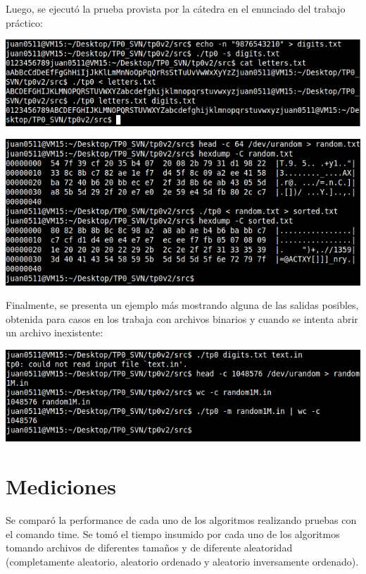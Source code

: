 \documentclass[a4paper,10pt]{article}
\begin{document}
Luego, se ejecut\'o la prueba provista por la c\'atedra en el enunciado del trabajo pr\'actico:
\begin{center}
\includegraphics[scale=0.60]{2.png}
\end{center}

\begin{center}
\includegraphics[scale=0.60]{3.png}
\end{center}
\pagebreak

Finalmente, se presenta un ejemplo m\'as mostrando alguna de las salidas posibles, obtenida para casos en los trabaja con archivos binarios y cuando se intenta abrir un archivo inexistente:\\
\begin{center}
\includegraphics[scale=0.60]{4.png}
\end{center}
\pagebreak

\section{Mediciones} 
Se compar\'o la performance de cada uno de los algoritmos realizando pruebas con el comando time. Se tom\'o el tiempo insumido por cada uno de los algoritmos tomando archivos de diferentes tama\~nos y de diferente aleatoridad (completamente aleatorio, aleatorio ordenado y aleatorio inversamente ordenado).
\end{document}
